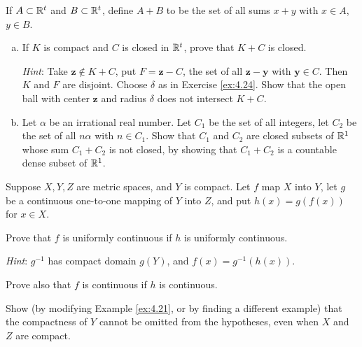\begin{myExercise}
    \label{ex:4.25}
    If $A \subset {\protect\mathbb R}^t$ and $B \subset {\protect\mathbb R}^t$, 
    define $A + B$ to be the set of all sums $x + y$ with $x \in A$, $y \in B$.
    \begin{enumerate}[(a)]
        \item If $K$ is compact and $C$ is closed in ${\protect\mathbb R}^t$, 
        prove that $K + C$ is closed.

        \emph{Hint}: Take $\mathbf{z} \not\in K + C$, put $F= \mathbf{z}- C$, the set of all $\mathbf{z- y}$ with $\mathbf{y} \in C$. 
        Then $K$ and $F$ are disjoint. 
        Choose $\delta$ as in Exercise \ref{ex:4.24}. 
        Show that the open ball with center $\mathbf{z}$ and radius $\delta$ does not intersect $K + C$.
        \item Let $\alpha$ be an irrational real number. 
        Let $C_1$ be the set of all integers, 
        let $C_2$ be the set of all $n\alpha$ with $n \in C_1$. 
        Show that $C_1$ and $C_2$ are closed subsets of ${\protect\mathbb R}^1$ whose
        sum $C_1 + C_2$ is not closed, by showing that $C_1 + C_2$ is a countable dense subset of ${\protect\mathbb R}^1$.
    \end{enumerate}
\end{myExercise}


\begin{myExercise}
    \label{ex:4.26}
    Suppose $X, Y, Z$ are metric spaces, and $Y$ is compact. 
    Let $f$ map $X$ into $Y$, 
    let $g$ be a continuous one-to-one mapping of $Y$ into $Z$, 
    and put $h(x) = g(f(x))$ for $x \in X$.

    Prove that $f$ is uniformly continuous if $h$ is uniformly continuous.
    
    \emph{Hint}: $g^{-1}$ has compact domain $g(Y)$, and $f(x) = g^{-1}(h(x))$. 
    
    Prove also that $f$ is continuous if $h$ is continuous. 

    Show (by modifying Example \ref{ex:4.21}, or by finding a different example) that the compactness of $Y$ cannot be omitted from the hypotheses, even when $X$ and $Z$ are compact.
\end{myExercise}